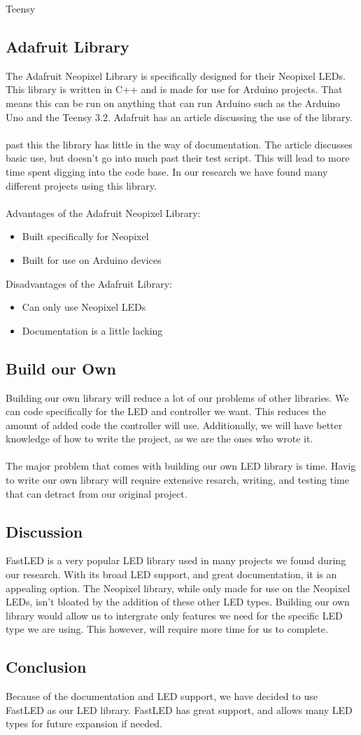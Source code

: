 Teensy\documentclass[onecolumn, draftclsnofoot,10pt, compsoc]{IEEEtran}
\begin{document}
		\subsection{Adafruit Library}
		The Adafruit Neopixel Library is specifically designed for their Neopixel
		LEDs. This library is written in C++ and is made for use for Arduino
		projects. That means this can be run on anything that can run Arduino such
		as the Arduino Uno and the Teensy 3.2. Adafruit has an article discussing
		the use of the library\cite[Pg 2]{neolib}.
		\\\\
		past this the library has little in the way of documentation. The article
		discusses basic use, but doesn't go into much past their test script. This
		will lead to more time spent digging into the code base. In our research we
		have found many different projects using this library.
		\\\\
		Advantages of the Adafruit Neopixel Library:
		\begin{itemize}
			\item Built specifically for Neopixel
			\item Built for use on Arduino devices
		\end{itemize}
		Disadvantages of the Adafruit Library:
		\begin{itemize}
			\item Can only use Neopixel LEDs
			\item Documentation is a little lacking
		\end{itemize}
		\subsection{Build our Own}
		Building our own library will reduce a lot of our problems of other
		libraries. We can code specifically for the LED and controller we want.
		This reduces the amount of added code the controller will use. Additionally,
		we will have better knowledge of how to write the project, as we are the
		ones who wrote it.
		\\\\
		The major problem that comes with building our own LED library is time.
		Havig to write our own library will require extensive resarch, writing, and
		testing time that can detract from our original project.
		\subsection{Discussion}
		FastLED is a very popular LED library used in many projects we found
		during our research. With its broad LED support, and great documentation,
		it is an appealing option. The Neopixel library, while only made for use on
		the Neopixel LEDs, isn't bloated by the addition of these other LED types.
		Building our own library would allow us to intergrate only features we need
		for the specific LED type we are using. This however, will require more
		time for us to complete.
		\subsection{Conclusion}
		Because of the documentation and LED support, we have decided to use
		FastLED as our LED library. FastLED has great support, and allows many LED
		types for future expansion if needed.


	
\end{document}

